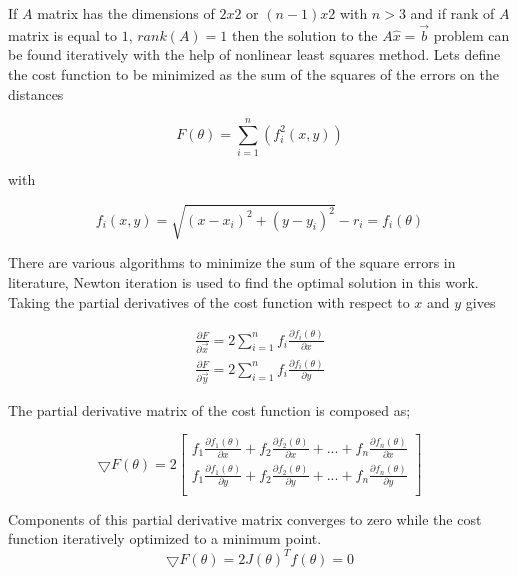 \documentclass[twoside]{article}
\begin{document}
\begin{multicols}{2}
	If $A$ matrix has the dimensions of $2x2$ or $(n-1)x2$ with $n>3$ and if rank of $A$ matrix is equal to $1$, $rank(A) = 1$ then the solution to the $A\hat{x} = \vec{b}$ problem can be found iteratively with the help of nonlinear least squares method. Lets define the cost function to be minimized 	as the sum of the squares of the errors on the distances
	
	\begin{equation}
    F(\theta) = \sum_{i=1}^{n} \left(f_i^2(x,y)\right)
	\end{equation}
	
	with
	
	\begin{equation}
   f_i(x,y) = \sqrt{(x-x_i)^2 + (y - y_i)^2} - r_i = f_i(\theta) 
	\end{equation}

There are various algorithms to minimize the sum of the square errors in literature, Newton iteration is used to find the optimal solution in this work.  Taking the partial derivatives of the cost function with respect to $x$ and $y$ gives 

\begin{align*}
\frac{\partial{F}}{\partial{\vec{x}}} = 2\sum_{i=1}^{n}f_i\frac{\partial{f_i(\theta)}}{\partial{x}} \\
\frac{\partial{F}}{\partial{\vec{y}}} = 2\sum_{i=1}^{n}f_i\frac{\partial{f_i(\theta)}}{\partial{y}}
\end{align*}

The partial derivative matrix of the cost function is composed as;

\begin{equation}
\bigtriangledown{F(\theta)} = 2 
\begin{bmatrix}
f_1\frac{\partial{f_1(\theta)}}{\partial{x}} + f_2\frac{\partial{f_2(\theta)}}{\partial{x}} + ... + f_n\frac{\partial{f_n(\theta)}}{\partial{x}} \\
f_1\frac{\partial{f_1(\theta)}}{\partial{y}} + f_2\frac{\partial{f_2(\theta)}}{\partial{y}} + ... + f_n\frac{\partial{f_n(\theta)}}{\partial{y}} \\
\end{bmatrix}
\end{equation}	
	
Components of this partial derivative matrix converges to zero while the cost function iteratively optimized to a minimum point. 
\begin{equation}
\bigtriangledown{F(\theta)} = 2J(\theta)^Tf(\theta) = 0
\end{equation}


\end{multicols}
\end{document}
